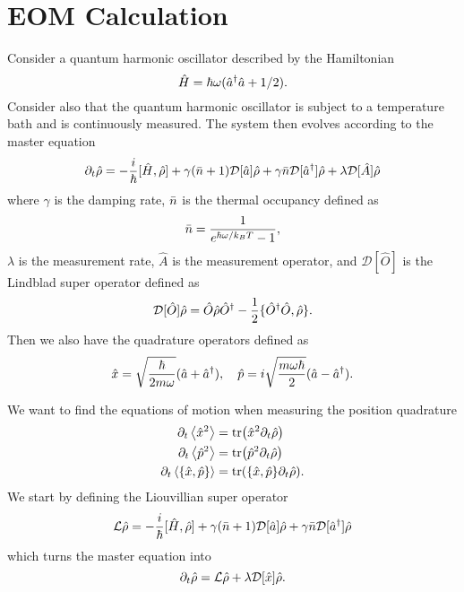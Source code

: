 \section{EOM Calculation}\label{app:eom}
Consider a quantum harmonic oscillator described by the Hamiltonian
\begin{equation}
    \hat{H} = \hbar \omega ( \hat{a}^{\dagger} \hat{a} + 1/2 ).
\end{equation}
Consider also that the quantum harmonic oscillator is subject to a temperature bath and is continuously measured. The system then evolves according to the master equation
\begin{equation}
    \partial_t \hat{\rho} = -\frac{i}{\hbar} [\hat{H}, \hat{\rho}] + \gamma (\bar{n} + 1 ) \mathcal{D}[\hat{a}] \hat{\rho} + \gamma \bar{n} \mathcal{D}[\hat{a}^{\dagger}] \hat{\rho} + \lambda \mathcal{D}[\hat{A}] \hat{\rho} \label{eq:app_master}
\end{equation}
where $\gamma$ is the damping rate, $\bar{n}$ is the thermal occupancy defined as 
\begin{equation}
    \bar{n} = \frac{1}{e^{\hbar \omega / k_B T} - 1},
\end{equation}
$\lambda$ is the measurement rate, $\hat{A}$ is the measurement operator, and $\mathcal{D}[\hat{O}]$ is the Lindblad super operator defined as
\begin{equation}
    \mathcal{D}[\hat{O}] \hat{\rho} = \hat{O} \hat{\rho} \hat{O}^\dagger - \frac{1}{2} \{ \hat{O}^\dagger \hat{O}, \hat{\rho} \}.
\end{equation}
Then we also have the quadrature operators defined as 
\begin{equation}
    \hat{x} = \sqrt{\frac{\hbar}{2 m \omega}} (\hat{a} + \hat{a}^{\dagger}), \quad \hat{p} = i \sqrt{\frac{m \omega \hbar}{2}} (\hat{a} - \hat{a}^{\dagger}).
\end{equation}

We want to find the equations of motion when measuring the position quadrature
\begin{align}
    \dt\expval{\xop^2} &= \tr(\xop^2 \dt \dmatrix)\label{eq:app_x2} \\
    \dt\expval{\pop^2} &= \tr(\pop^2 \dt \dmatrix)\label{eq:app_p2}\\
    \dt\expval{\acomm{\xop}{\pop}} &= \tr(\acomm{\xop}{\pop} \dt \dmatrix). \label{eq:app_xp}
\end{align}
We start by defining the Liouvillian super operator
\begin{equation}
    \mathcal{L}\hat{\rho} = -\frac{i}{\hbar} [\hat{H}, \hat{\rho}] + \gamma (\bar{n} + 1 ) \mathcal{D}[\hat{a}] \hat{\rho} + \gamma \bar{n} \mathcal{D}[\hat{a}^{\dagger}] \hat{\rho}
\end{equation}
which turns the master equation into
\begin{equation}
    \partial_t \hat{\rho} = \mathcal{L}\hat{\rho} + \lambda \mathcal{D}[\hat{x}] \hat{\rho}.
\end{equation}
